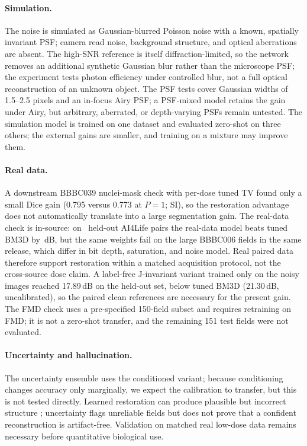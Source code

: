 \documentclass[10pt]{article}
\begin{document}
\paragraph{Simulation.}
The noise is simulated as Gaussian-blurred Poisson noise with a known,
spatially invariant PSF; camera read noise, background structure, and optical
aberrations are absent. The high-SNR reference is itself diffraction-limited,
so the network removes an additional synthetic Gaussian blur rather than the
microscope PSF; the experiment tests photon efficiency under controlled blur,
not a full optical reconstruction of an unknown object. The PSF tests cover
Gaussian widths of 1.5--2.5 pixels and an in-focus Airy PSF; a PSF-mixed model
retains the gain under Airy, but arbitrary, aberrated, or depth-varying PSFs
remain untested. The simulation model is trained on one dataset and evaluated
zero-shot on three others; the external gains are smaller, and training on a
mixture may improve them.

\paragraph{Real data.}
A downstream BBBC039 nuclei-mask check with per-dose tuned TV found only a
small Dice gain (0.795 versus 0.773 at $P=1$; SI), so the restoration advantage
does not automatically translate into a large segmentation gain. The real-data
check is in-source: on \RealN\ held-out AI4Life pairs the real-data model beats
tuned BM3D by \RealGain\,dB, but the same weights fail on the large BBBC006
fields in the same release, which differ in bit depth, saturation, and noise
model. Real paired data therefore support restoration within a matched
acquisition protocol, not the cross-source dose claim. A label-free
J-invariant variant \cite{batson2019noise2self} trained only on the noisy
images reached 17.89\,dB on the held-out set,
below tuned BM3D (21.30\,dB, uncalibrated), so the paired clean references are necessary for
the present gain. The FMD check uses a pre-specified 150-field subset and
requires retraining on FMD; it is not a zero-shot transfer, and the remaining
151 test fields were not evaluated.

\paragraph{Uncertainty and hallucination.}
The uncertainty ensemble uses the conditioned variant; because conditioning
changes accuracy only marginally, we expect the calibration to transfer, but
this is not tested directly. Learned restoration can produce plausible but incorrect structure \cite{blau2018perception}; uncertainty
flags unreliable fields but does not prove that a confident reconstruction is
artifact-free. Validation on matched real low-dose data remains necessary
before quantitative biological use.
\end{document}
